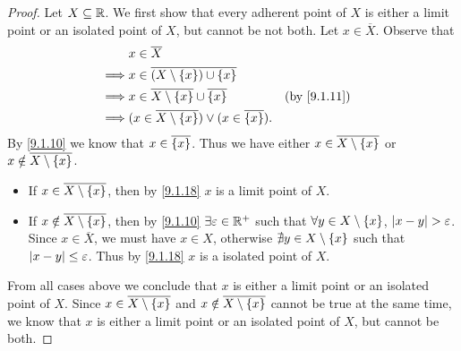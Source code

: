 \begin{proof}
  Let \(X \subseteq \mathbb{R}\).
  We first show that every adherent point of \(X\) is either a limit point or an isolated point of \(X\), but cannot be not both.
  Let \(x \in \overline{X}\).
  Observe that
  \begin{align*}
             & x \in \overline{X}                                                                       \\
    \implies & x \in \overline{(X \setminus \set{x}) \cup \set{x}}                                      \\
    \implies & x \in \overline{X \setminus \set{x}} \cup \overline{\set{x}}            &  & \by{9.1.11} \\
    \implies & (x \in \overline{X \setminus \set{x}}) \lor (x \in \overline{\set{x}}).
  \end{align*}
  By \cref{9.1.10} we know that \(x \in \overline{\left\lbrace x\right\rbrace}\).
  Thus we have either \(x \in \overline{X \setminus \left\lbrace x\right\rbrace}\) or \(x \notin \overline{X \setminus \left\lbrace x\right\rbrace}\).
  \begin{itemize}
    \item If \(x \in \overline{X \setminus \left\lbrace x\right\rbrace}\), then by \cref{9.1.18} \(x\) is a limit point of \(X\).
    \item If \(x \notin \overline{X \setminus \left\lbrace x\right\rbrace}\), then by \cref{9.1.10} \(\exists \varepsilon \in \mathbb{R}^+\) such that \(\forall y \in X \setminus \left\lbrace x\right\rbrace\), \(\left\lvert x - y\right\rvert > \varepsilon\).
          Since \(x \in \overline{X}\), we must have \(x \in X\), otherwise \(\nexists y \in X \setminus \left\lbrace x\right\rbrace\) such that \(\left\lvert x - y\right\rvert \leq \varepsilon\).
          Thus by \cref{9.1.18} \(x\) is a isolated point of \(X\).
  \end{itemize}
  From all cases above we conclude that \(x\) is either a limit point or an isolated point of \(X\).
  Since \(x \in \overline{X \setminus \left\lbrace x\right\rbrace}\) and \(x \notin \overline{X \setminus \left\lbrace x\right\rbrace}\) cannot be true at the same time, we know that \(x\) is either a limit point or an isolated point of \(X\), but cannot be both.


\end{proof}

